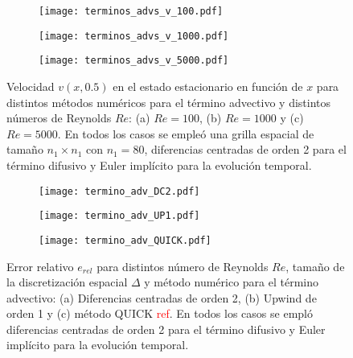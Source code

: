 \documentclass[aps,prb,twocolumn,superscriptaddress,floatfix,longbibliography,10pt]{revtex4-2}
\newcounter{para}
\begin{document}
\begin{figure}
  \centering
  \begin{subfigure}[b]{0.32\textwidth}
    \centering
    \texttt{[image: terminos\_advs\_v\_100.pdf]}
    \caption{}
    \label{fig:terminos_advs_v_100}
  \end{subfigure}
  \hfill
  \begin{subfigure}[b]{0.32\textwidth}
    \centering
    \texttt{[image: terminos\_advs\_v\_1000.pdf]}
    \caption{}
    \label{fig:terminos_advs_v_1000}
  \end{subfigure}
  \hfill
  \begin{subfigure}[b]{0.32\textwidth}
    \centering
    \texttt{[image: terminos\_advs\_v\_5000.pdf]}
    \caption{}
    \label{fig:terminos_advs_v_5000}
  \end{subfigure}
     \caption{Velocidad $v(x,0.5)$ en el estado estacionario en función de $x$ para distintos métodos numéricos para el término advectivo y distintos números de Reynolds $Re$: (a) $Re = 100$, (b) $Re = 1000$ y (c) $Re = 5000$. En todos los casos se empleó una grilla espacial de tamaño $n_1 \times n_1$ con $n_1 = 80$, diferencias centradas de orden 2 para el término difusivo y Euler implícito para la evolución temporal.}
     \label{fig:terminos_advs_v}
\end{figure}



\begin{figure}
  \centering
  \begin{subfigure}[b]{0.32\textwidth}
      \centering
      \texttt{[image: termino\_adv\_DC2.pdf]}
      \caption{}
      \label{fig:termino_adv_DC2}
  \end{subfigure}
  \hfill
  \begin{subfigure}[b]{0.32\textwidth}
      \centering
      \texttt{[image: termino\_adv\_UP1.pdf]}
      \caption{}
      \label{fig:termino_adv_UP1}
  \end{subfigure}
  \hfill
  \begin{subfigure}[b]{0.32\textwidth}
      \centering
      \texttt{[image: termino\_adv\_QUICK.pdf]}
      \caption{}
      \label{fig:termino_adv_QUICK}
  \end{subfigure}
     \caption{Error relativo $e_{rel}$ para distintos número de Reynolds $Re$, tamaño de la discretización espacial $\Delta$ y método numérico para el término advectivo: (a) Diferencias centradas de orden 2, (b) Upwind de orden 1 y (c) método QUICK \textcolor{red}{ref}. En todos los casos se empló diferencias centradas de orden 2 para el término difusivo y Euler implícito para la evolución temporal.}
     \label{fig:termino_advectivo}
\end{figure}
\end{document}
